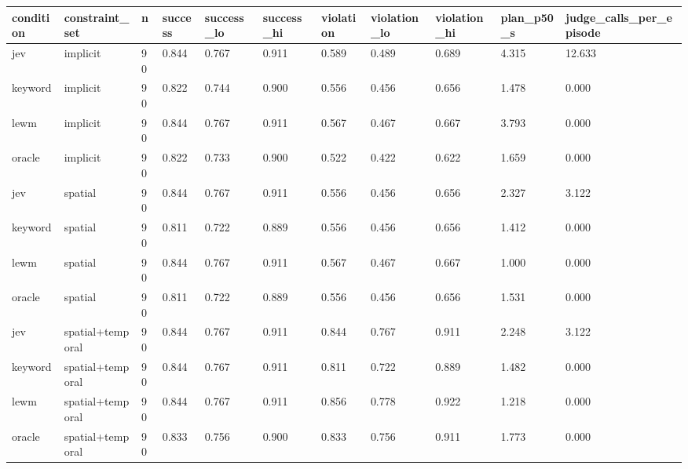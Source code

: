 \begin{tabular}{lllllllllll}
\toprule
condition & constraint\_set & n & success & success\_lo & success\_hi & violation & violation\_lo & violation\_hi & plan\_p50\_s & judge\_calls\_per\_episode \\
\midrule
jev & implicit & 90 & 0.844 & 0.767 & 0.911 & 0.589 & 0.489 & 0.689 & 4.315 & 12.633 \\
keyword & implicit & 90 & 0.822 & 0.744 & 0.900 & 0.556 & 0.456 & 0.656 & 1.478 & 0.000 \\
lewm & implicit & 90 & 0.844 & 0.767 & 0.911 & 0.567 & 0.467 & 0.667 & 3.793 & 0.000 \\
oracle & implicit & 90 & 0.822 & 0.733 & 0.900 & 0.522 & 0.422 & 0.622 & 1.659 & 0.000 \\
jev & spatial & 90 & 0.844 & 0.767 & 0.911 & 0.556 & 0.456 & 0.656 & 2.327 & 3.122 \\
keyword & spatial & 90 & 0.811 & 0.722 & 0.889 & 0.556 & 0.456 & 0.656 & 1.412 & 0.000 \\
lewm & spatial & 90 & 0.844 & 0.767 & 0.911 & 0.567 & 0.467 & 0.667 & 1.000 & 0.000 \\
oracle & spatial & 90 & 0.811 & 0.722 & 0.889 & 0.556 & 0.456 & 0.656 & 1.531 & 0.000 \\
jev & spatial+temporal & 90 & 0.844 & 0.767 & 0.911 & 0.844 & 0.767 & 0.911 & 2.248 & 3.122 \\
keyword & spatial+temporal & 90 & 0.844 & 0.767 & 0.911 & 0.811 & 0.722 & 0.889 & 1.482 & 0.000 \\
lewm & spatial+temporal & 90 & 0.844 & 0.767 & 0.911 & 0.856 & 0.778 & 0.922 & 1.218 & 0.000 \\
oracle & spatial+temporal & 90 & 0.833 & 0.756 & 0.900 & 0.833 & 0.756 & 0.911 & 1.773 & 0.000 \\
\bottomrule
\end{tabular}